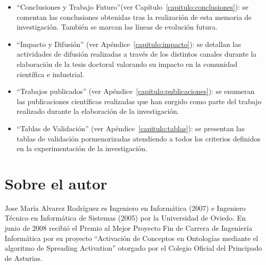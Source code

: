 \begin{itemize}
\item ``Conclusiones y Trabajo Futuro''(ver Capítulo~\ref{capitulo:conclusiones}): se comentan las conclusiones obtenidas
tras la realización de esta memoria de investigación. También se marcan las líneas de evolución futura.

\item ``Impacto y Difusión'' (ver Apéndice~\ref{capitulo:impacto}): se detallan las actividades
de difusión realizadas a través de los distintos canales durante la elaboración de la tesis doctoral valorando su impacto
en la comunidad científica e industrial.


\item ``Trabajos publicados'' (ver Apéndice~\ref{capitulo:publicaciones}): se enumeran
las publicaciones científicas realizadas que han surgido como parte del trabajo realizado
durante la elaboración de la investigación.


\item ``Tablas de Validación'' (ver Apéndice~\ref{capitulo:tablas}): se presentan
las tablas de validación pormenorizadas atendiendo a todos los criterios definidos
en la experimentación de la investigación.


\end{itemize}

\chapter*{Sobre el autor}

Jose María Alvarez Rodríguez es Ingeniero en Informática (2007) e Ingeniero Técnico en Informática de Sistemas (2005) por la Universidad de Oviedo. 
En junio de 2008 recibió el Premio al Mejor Proyecto Fin de Carrera de Ingeniería Informática por su proyecto ``Activación de Conceptos 
en Ontologías mediante el algoritmo de Spreading Activation'' otorgado por el Colegio Oficial del Principado de Asturias. 


